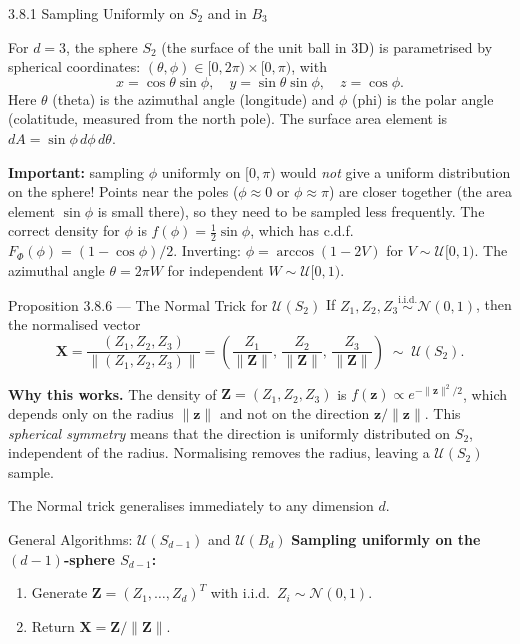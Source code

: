 \documentclass[aspectratio=169,10pt]{beamer}
\newcommand{\UU}{\mathcal{U}}
\newcommand{\NN}{\mathcal{N}}
\begin{document}
\begin{frame}[allowframebreaks]{3.8.1 Sampling Uniformly on $S_2$ and in $B_3$}

For $d = 3$, the sphere $S_2$ (the surface of the unit ball in 3D) is parametrised
by spherical coordinates: $(\theta, \phi) \in [0,2\pi) \times [0,\pi)$, with
\[
  x = \cos\theta\sin\phi, \quad y = \sin\theta\sin\phi, \quad z = \cos\phi.
\]
Here $\theta$ (theta) is the azimuthal angle (longitude) and $\phi$ (phi) is the
polar angle (colatitude, measured from the north pole).  The surface area element is
$dA = \sin\phi\,d\phi\,d\theta$.

\textbf{Important:} sampling $\phi$ uniformly on $[0, \pi)$ would \emph{not}
give a uniform distribution on the sphere!  Points near the poles ($\phi \approx 0$
or $\phi \approx \pi$) are closer together (the area element $\sin\phi$ is small
there), so they need to be sampled less frequently.  The correct density for $\phi$
is $f(\phi) = \frac{1}{2}\sin\phi$, which has c.d.f.\ $F_\Phi(\phi) = (1-\cos\phi)/2$.
Inverting: $\phi = \arccos(1 - 2V)$ for $V \sim \UU[0,1)$.
The azimuthal angle $\theta = 2\pi W$ for independent $W \sim \UU[0,1)$.

\begin{block}{Proposition 3.8.6 --- The Normal Trick for $\UU(S_2)$}
  If $Z_1, Z_2, Z_3 \stackrel{\text{i.i.d.}}{\sim} \NN(0,1)$, then the normalised
  vector
  \[
    \mathbf{X} = \frac{(Z_1, Z_2, Z_3)}{\|(Z_1,Z_2,Z_3)\|}
    = \left(\frac{Z_1}{\|\mathbf{Z}\|},\, \frac{Z_2}{\|\mathbf{Z}\|},\,
    \frac{Z_3}{\|\mathbf{Z}\|}\right)
    \;\sim\; \UU(S_2).
  \]
\end{block}

\textbf{Why this works.}  The density of $\mathbf{Z} = (Z_1, Z_2, Z_3)$ is
$f(\mathbf{z}) \propto e^{-\|\mathbf{z}\|^2/2}$, which depends only on the
radius $\|\mathbf{z}\|$ and not on the direction $\mathbf{z}/\|\mathbf{z}\|$.
This \emph{spherical symmetry} means that the direction is uniformly distributed
on $S_2$, independent of the radius.  Normalising removes the radius, leaving
a $\UU(S_2)$ sample.

\framebreak

The Normal trick generalises immediately to any dimension $d$.

\begin{block}{General Algorithms: $\UU(S_{d-1})$ and $\UU(B_d)$}
  \textbf{Sampling uniformly on the $(d-1)$-sphere $S_{d-1}$:}
  \begin{enumerate}
    \item Generate $\mathbf{Z} = (Z_1, \ldots, Z_d)^T$ with i.i.d.\ $Z_i \sim \NN(0,1)$.
    \item Return $\mathbf{X} = \mathbf{Z}/\|\mathbf{Z}\|$.
  \end{enumerate}


\end{block}
\end{frame}
\end{document}

